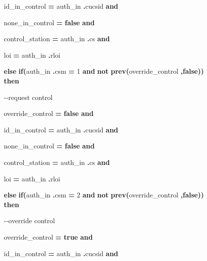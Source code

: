 \begin{figure}
{{id\_in\_control {\color{color18} \textbf{=}} auth\_in{\color{color18} \textbf{.}}cucsid 
{\color{color18} \textbf{and      }}

none\_in\_control {\color{color18} \textbf{=}} {\color{color18} \textbf{false}} 
{\color{color18} \textbf{and      }}

control\_station {\color{color18} \textbf{=}} auth\_in{\color{color18} \textbf{.}}cs 
{\color{color18} \textbf{and      }}

loi {\color{color18} \textbf{=}} auth\_in{\color{color18} \textbf{.}}rloi    

\parindent=0pt
{\color{color18} \textbf{else}} {\color{color18} \textbf{if(}}auth\_in{\color{color18} \textbf{.}}csm 
{\color{color18} \textbf{=}} 1 {\color{color18} \textbf{and}} {\color{color18} \textbf{not}} 
{\color{color18} \textbf{prev(}}override\_control{\color{color18} \textbf{,false))}} 
{\color{color18} \textbf{then}}       

{\color{color17} -{}-request control      }

\parindent=21pt
override\_control {\color{color18} \textbf{=}} {\color{color18} \textbf{false}} 
{\color{color18} \textbf{and      }}

id\_in\_control {\color{color18} \textbf{=}} auth\_in{\color{color18} \textbf{.}}cucsid 
{\color{color18} \textbf{and      }}

none\_in\_control {\color{color18} \textbf{=}} {\color{color18} \textbf{false}} 
{\color{color18} \textbf{and      }}

control\_station {\color{color18} \textbf{=}} auth\_in{\color{color18} \textbf{.}}cs 
{\color{color18} \textbf{and      }}

loi {\color{color18} \textbf{=}} auth\_in{\color{color18} \textbf{.}}rloi    

\parindent=0pt
{\color{color18} \textbf{else}} {\color{color18} \textbf{if(}}auth\_in{\color{color18} \textbf{.}}csm 
{\color{color18} \textbf{=}} 2 {\color{color18} \textbf{and}} {\color{color18} \textbf{not}} 
{\color{color18} \textbf{prev(}}override\_control{\color{color18} \textbf{,false))}} 
{\color{color18} \textbf{then}}       

{\color{color17} -{}-override control      }

\parindent=21pt
override\_control {\color{color18} \textbf{=}} {\color{color18} \textbf{true}} 
{\color{color18} \textbf{and      }}

id\_in\_control {\color{color18} \textbf{=}} auth\_in{\color{color18} \textbf{.}}cucsid 
{\color{color18} \textbf{and      }}

}}
\end{figure}
